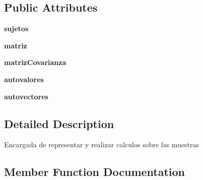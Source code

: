 \subsection*{Public Attributes}
\begin{DoxyCompactItemize}
\item 
\mbox{\label{classinicio_1_1modelo_1_1muestra_1_1muestra_ad1927a80cc26b0a4646714af1c2bf0cd}} 
{\bfseries sujetos}
\item 
\mbox{\label{classinicio_1_1modelo_1_1muestra_1_1muestra_a057fea2d4c2b345581f6fae6e1176137}} 
{\bfseries matriz}
\item 
\mbox{\label{classinicio_1_1modelo_1_1muestra_1_1muestra_a6d0dc58bd3966414946e31e177fc2575}} 
{\bfseries matriz\+Covarianza}
\item 
\mbox{\label{classinicio_1_1modelo_1_1muestra_1_1muestra_ab3af3b7aecc0449f98d621e73aa78da1}} 
{\bfseries autovalores}
\item 
\mbox{\label{classinicio_1_1modelo_1_1muestra_1_1muestra_a1d86c1868968a8ef006ba084204b57fb}} 
{\bfseries autovectores}
\end{DoxyCompactItemize}


\subsection{Detailed Description}
\begin{DoxyVerb}Encargada de representar y realizar calculos sobre las muestras 
\end{DoxyVerb}
 

\subsection{Member Function Documentation}
\mbox{\label{classinicio_1_1modelo_1_1muestra_1_1muestra_aefb6a206689e6f0ff049028b68c5dc00}} 
